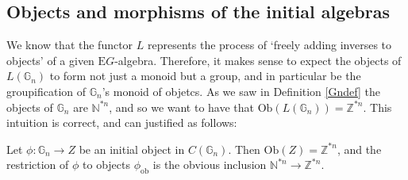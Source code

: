 \documentclass{amsart} %
\begin{document}
\subsection{Objects and morphisms of the initial algebras}

We know that the functor $L$ represents the process of `freely adding inverses to objects' of a given $\mathrm{E}G$-algebra. Therefore, it makes sense to expect the objects of $L(\mathbb{G}_n)$ to form not just a monoid but a group, and in particular be the groupification of $\mathbb{G}_n$'s monoid of objetcs. As we saw in Definition \ref{Gndef} the objects of $\mathbb{G}_n$ are $\mathbb{N}^{*n}$, and so we want to have that $\mathrm{Ob}(L(\mathbb{G}_n)) = \mathbb{Z}^{*n}$. This intuition is correct, and can justified as follows:

\begin{prop}\label{Zobj} Let $\phi: \mathbb{G}_n \to Z$ be an initial object in $C(\mathbb{G}_n)$. Then $\mathrm{Ob}(Z) = \mathbb{Z}^{*n}$, and the restriction of $\phi$ to objects $\phi_{\mathrm{ob}}$ is the obvious inclusion $\mathbb{N}^{*n} \to \mathbb{Z}^{*n}$.
\end{prop}
\end{document}
